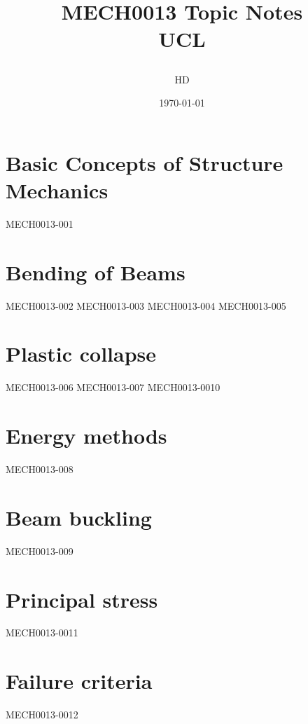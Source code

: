 \documentclass[12pt,a4paper, twoside]{report}
\begin{document}
\title{
  {MECH0013 Topic Notes}\\
  {\large UCL}
  \author{HD}
  \date{\today}
}
\maketitle
\tableofcontents
\chapter{Basic Concepts of Structure Mechanics}
{MECH0013-001}
\chapter{Bending of Beams}
{MECH0013-002}
{MECH0013-003}
{MECH0013-004}
{MECH0013-005}
\chapter{Plastic collapse}
{MECH0013-006}
{MECH0013-007}
{MECH0013-0010}
\chapter{Energy methods}
{MECH0013-008}
\chapter{Beam buckling}
{MECH0013-009}
\chapter{Principal stress}
{MECH0013-0011}
\chapter{Failure criteria}
{MECH0013-0012}
\end{document}
